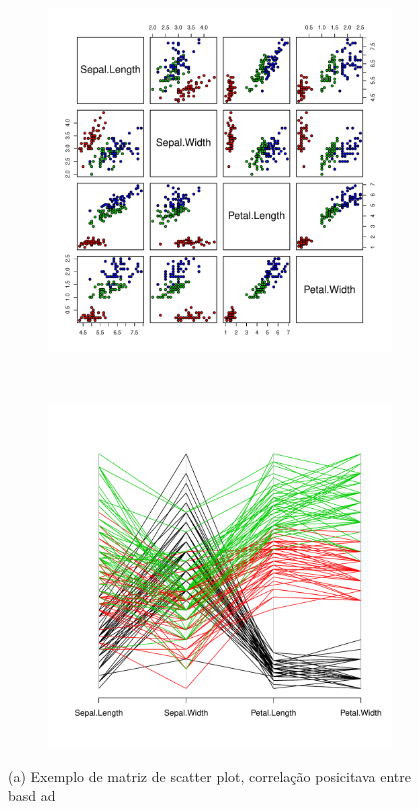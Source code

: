\begin{figure}[h!]
  \centering
  \begin{subfigure}[b]{0.5\textwidth}
    \centering
    \includegraphics[width=\textwidth]{images/smatrix.pdf}
    \caption{}
    \label{fig:smatrix}
  \end{subfigure}%
  ~ %
  \begin{subfigure}[b]{0.5\textwidth}
    \centering
    \includegraphics[width=\textwidth]{images/parcoord.pdf}
    \caption{}
    \label{fig:parcoord}
  \end{subfigure}
  \caption[Exemplos de matriz de scatter plot e coordenadas paralelas.]{(a) Exemplo de matriz de scatter plot, correlação posicitava entre basd ad}
\end{figure}

